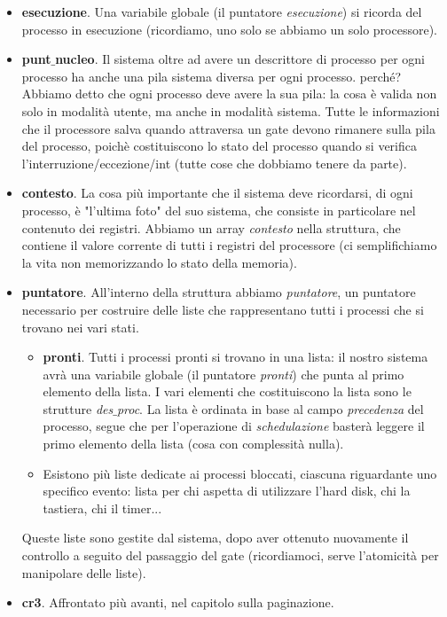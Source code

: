 \documentclass[11pt]{report}
\theoremstyle{definition}
\begin{document}
\begin{itemize}
	\item \textbf{esecuzione}. Una variabile globale (il puntatore \emph{esecuzione}) si ricorda del processo in esecuzione (ricordiamo, uno solo se abbiamo un solo processore).
	\item \textbf{punt$\_$nucleo}. Il sistema oltre ad avere un descrittore di processo per ogni processo ha anche una pila sistema diversa per ogni processo. perché? Abbiamo detto che ogni processo deve avere la sua pila: la cosa è valida non solo in modalità utente, ma anche in modalità sistema. Tutte le informazioni che il processore salva quando attraversa un gate devono rimanere sulla pila del processo, poichè costituiscono lo stato del processo quando si verifica l'interruzione/eccezione/int (tutte cose che dobbiamo tenere da parte).
\item \textbf{contesto}. La cosa più importante che il sistema deve ricordarsi, di ogni processo, è "l'ultima foto" del suo sistema, che consiste in particolare nel contenuto dei registri. Abbiamo un array \emph{contesto} nella struttura, che contiene il valore corrente di tutti i registri del processore (ci semplifichiamo la vita non memorizzando lo stato della memoria).
\item \textbf{puntatore}. All'interno della struttura abbiamo \emph{puntatore}, un puntatore necessario per costruire delle liste che rappresentano tutti i processi che si trovano nei vari stati. 
\begin{itemize}
\item \textbf{pronti}. Tutti i processi pronti si trovano in una lista: il nostro sistema avrà una variabile globale (il puntatore \emph{pronti}) che punta al primo elemento della lista. I vari elementi che costituiscono la lista sono le strutture \emph{des$\_$proc}. La lista è ordinata in base al campo \emph{precedenza} del processo, segue che per l'operazione di \emph{schedulazione} basterà leggere il primo elemento della lista (cosa con complessità nulla).
\item Esistono più liste dedicate ai processi bloccati, ciascuna riguardante uno specifico evento: lista per chi aspetta di utilizzare l'hard disk, chi la tastiera, chi il timer...
\end{itemize}
Queste liste sono gestite dal sistema, dopo aver ottenuto nuovamente il controllo a seguito del passaggio del gate (ricordiamoci, serve l'atomicità per manipolare delle liste).
\item \textbf{cr3}. Affrontato più avanti, nel capitolo sulla paginazione.
\end{itemize}
\end{document}
